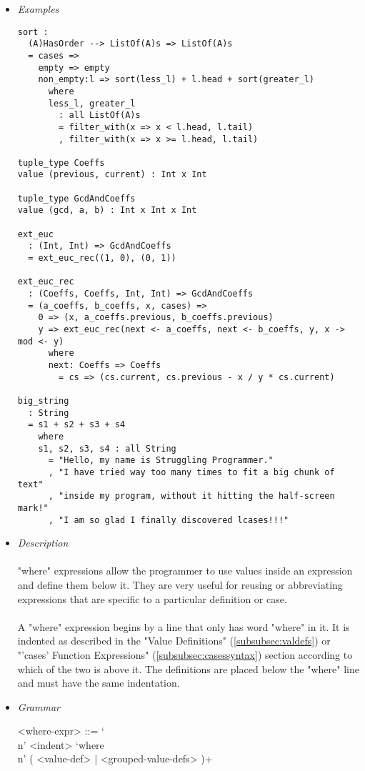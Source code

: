 \documentclass{article}
\begin{document}
\begin{itemize}

\item \textit{Examples}
\begin{verbatim}
sort :
  (A)HasOrder --> ListOf(A)s => ListOf(A)s
  = cases => 
    empty => empty
    non_empty:l => sort(less_l) + l.head + sort(greater_l)
      where
      less_l, greater_l
        : all ListOf(A)s
        = filter_with(x => x < l.head, l.tail)
        , filter_with(x => x >= l.head, l.tail)

tuple_type Coeffs
value (previous, current) : Int x Int

tuple_type GcdAndCoeffs
value (gcd, a, b) : Int x Int x Int

ext_euc
  : (Int, Int) => GcdAndCoeffs
  = ext_euc_rec((1, 0), (0, 1))

ext_euc_rec
  : (Coeffs, Coeffs, Int, Int) => GcdAndCoeffs
  = (a_coeffs, b_coeffs, x, cases) =>
    0 => (x, a_coeffs.previous, b_coeffs.previous)
    y => ext_euc_rec(next <- a_coeffs, next <- b_coeffs, y, x -> mod <- y)
      where
      next: Coeffs => Coeffs
        = cs => (cs.current, cs.previous - x / y * cs.current)

big_string
  : String
  = s1 + s2 + s3 + s4
    where
    s1, s2, s3, s4 : all String
      = "Hello, my name is Struggling Programmer."
      , "I have tried way too many times to fit a big chunk of text"
      , "inside my program, without it hitting the half-screen mark!"
      , "I am so glad I finally discovered lcases!!!"
\end{verbatim}

\item \textit{Description}\\\\
"where" expressions allow the programmer to use values inside an expression and
define them below it. They are very useful for reusing or abbreviating
expressions that are specific to a particular definition or case.
\\\\
A "where" expression begins by a line that only has word "where" in it. It is
indented as described in the "Value Definitions" (\ref{subsubsec:valdefs}) or
"'cases' Function Expressions" (\ref{subsubsec:casessyntax}) section according
to which of the two is above it.  The definitions are placed below the "where"
line and must have the same indentation. 

\item \textit{Grammar}
\begin{grammar}
<where-expr> ::=
`\\n' <indent> `where\\n' ( <value-def> | <grouped-value-defs> )+
\end{grammar}

\end{itemize}
\end{document}
